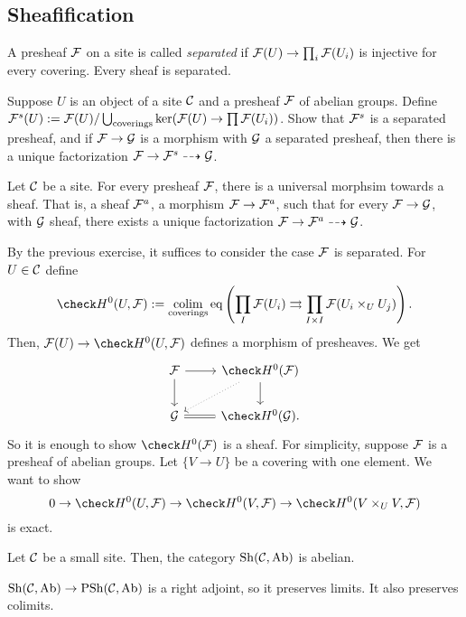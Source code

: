 \documentclass{../../../small}
\begin{document}
\subsection{Sheafification}

\begin{defn*}
A presheaf $\mathcal{F}$ on a site is called \emph{separated} if $\mathcal{F}(U)\to\prod_i\mathcal{F}(U_i)$ is injective for every covering.
Every sheaf is separated.
\end{defn*}
\begin{exe*}
Suppose $U$ is an object of a site $\mathcal{C}$ and a presheaf $\mathcal{F}$ of abelian groups.
Define $\mathcal{F}^s(U):=\mathcal{F}(U)/\bigcup_{\text{coverings}}\ker(\mathcal{F}(U)\to\prod\mathcal{F}(U_i))$.
Show that $\mathcal{F}^s$ is a separated presheaf, and if $\mathcal{F}\to\mathcal{G}$ is a morphism with $\mathcal{G}$ a separated presheaf, then there is a unique factorization $\mathcal{F}\to\mathcal{F}^s\dashrightarrow\mathcal{G}$.
\end{exe*}

\begin{prop*}
Let $\mathcal{C}$ be a site.
For every presheaf $\mathcal{F}$, there is a universal morphsim towards a sheaf.
That is, a sheaf $\mathcal{F}^a$, a morphism $\mathcal{F}\to\mathcal{F}^a$, such that for every $\mathcal{F}\to\mathcal{G}$, with $\mathcal{G}$ sheaf, there exists a unique factorization $\mathcal{F}\to\mathcal{F}^a\dashrightarrow\mathcal{G}$.
\end{prop*}
\begin{pf}
By the previous exercise, it suffices to consider the case $\mathcal{F}$ is separated.
For $U\in\mathcal{C}$ define
\[\check H^0(U,\cF):=\colim_{\text{coverings}}\mathrm{eq}\left(\prod_I\cF(U_i)\rightrightarrows\prod_{I\times I}\cF(U_i\times_UU_j)\right).\]
Then, $\cF(U)\to\check H^0(U,\cF)$ defines a morphism of presheaves.
We get
\[\begin{tikzcd}
\cF \rar\dar & \check H^0(\cF) \dar\ar[dotted]{dl}\\
\cG \rar[equal] & \check H^0(\cG).
\end{tikzcd}\]
So it is enough to show $\check H^0(\cF)$ is a sheaf.
For simplicity, suppose $\mathcal{F}$ is a presheaf of abelian groups.
Let $\{V\to U\}$ be a covering with one element.
We want to show
\[0\to \check H^0(U,\cF)\to\check H^0(V,\cF)\to\check H^0(V\times_UV,\cF)\]
is exact.

\end{pf}

\begin{cor*}
Let $\mathcal{C}$ be a small site.
Then, the category $\mathrm{Sh}(\mathcal{C},\mathrm{Ab})$ is abelian.
\end{cor*}

\begin{rmk*}
$\mathrm{Sh}(\mathcal{C},\mathrm{Ab})\to\mathrm{PSh}(\mathcal{C},\mathrm{Ab})$ is a right adjoint, so it preserves limits.
It also preserves colimits.
\end{rmk*}
\end{document}
